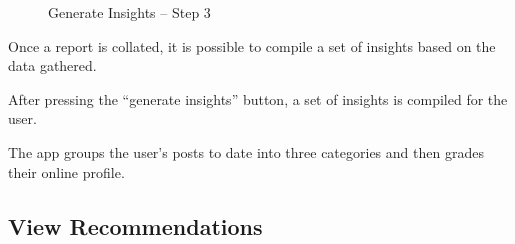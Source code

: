 \begin{figure}
\begin{minipage}{4.6cm}
    \caption{Generate Insights -- Step 3}
    \label{fig:ui_insight_step3}
  \end{minipage}
\end{figure}

\begin{minipage}{\textwidth}
  \centering
  \begin{minipage}[t]{4.6cm}
    \vspace{0pt}
    \centering
    \begin{minipage}{4.4cm}
      Once a report is collated, it is possible to compile a set of insights based on the data gathered.
    \end{minipage}
  \end{minipage}
  \begin{minipage}[t]{4.6cm}
    \vspace{0pt}
    \centering
    \begin{minipage}{4.4cm}
      After pressing the ``generate insights'' button, a set of insights is compiled for the user.
    \end{minipage}
  \end{minipage}
  \begin{minipage}[t]{4.6cm}
    \vspace{0pt}
    \centering
    \begin{minipage}{4.4cm}
      The app groups the user’s posts to date into three categories and then grades their online profile.
    \end{minipage}
  \end{minipage}
\end{minipage}

\clearpage

\subsection{View Recommendations}

